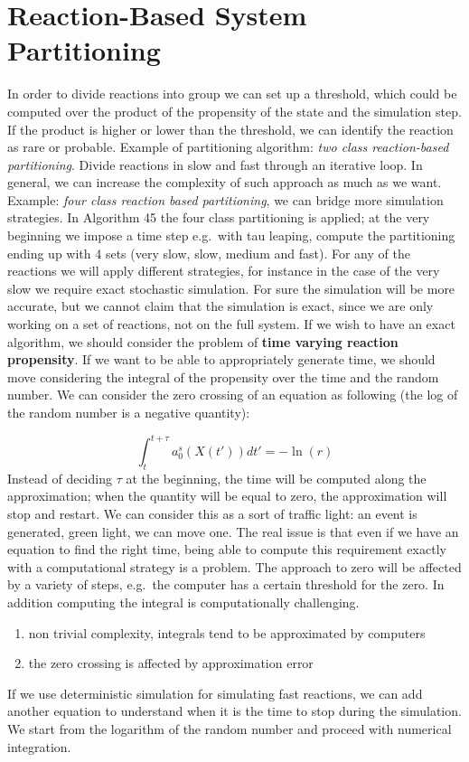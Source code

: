 \section{Reaction-Based System Partitioning}
In order to divide reactions into group we can set up a threshold, which could be computed over the product of the propensity of the state and the simulation step.
If the product is higher or lower than the threshold, we can identify the reaction as rare or probable.
Example of partitioning algorithm: \emph{two class reaction-based partitioning}.
Divide reactions in slow and fast through an iterative loop.
In general, we can increase the complexity of such approach as much as we want.
Example: \emph{four class reaction based partitioning}, we can bridge more simulation strategies.
In Algorithm 45 the four class partitioning is applied; at the very beginning we impose a time step e.g.~with tau leaping, compute the partitioning ending up with 4 sets (very slow, slow, medium and fast).
For any of the reactions we will apply different strategies, for instance in the case of the very slow we require exact stochastic simulation.
For sure the simulation will be more accurate, but we cannot claim that the simulation is exact, since we are only working on a set of reactions, not on the full system.
If we wish to have an exact algorithm, we should consider the problem of \textbf{time varying reaction propensity}.
If we want to be able to appropriately generate time, we should move considering the integral of the propensity over the time and the random number.
We can consider the zero crossing of an equation as following (the log of the random number is a negative quantity):

$$\int_t^{t+\tau}a_0^s (X(t')) dt' = - \ln(r)$$
\noindent
Instead of deciding $\tau$ at the beginning, the time will be computed along the approximation; when the quantity will be equal to zero, the approximation will stop and restart.
We can consider this as a sort of traffic light: an event is generated, green light, we can move one.
The real issue is that even if we have an equation to find the right time, being able to compute this requirement exactly with a computational strategy is a problem.
The approach to zero will be affected by a variety of steps, e.g.~the computer has a certain threshold for the zero.
In addition computing the integral is computationally challenging.

\begin{enumerate}
  \def\labelenumi{\arabic{enumi}.}
  \item non trivial complexity, integrals tend to be approximated by computers
  \item the zero crossing is affected by approximation error
\end{enumerate}
\noindent
If we use deterministic simulation for simulating fast reactions, we can add another equation to understand when it is the time to stop during the simulation.
We start from the logarithm of the random number and proceed with numerical integration.

